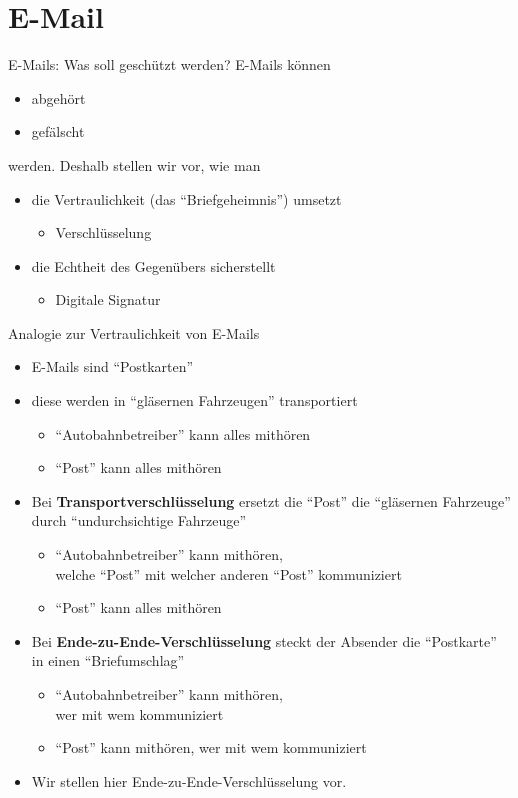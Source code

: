 \section{E-Mail}
  \begin{frame}{E-Mails: Was soll geschützt werden?}
    E-Mails können
    \begin{itemize}
      \item abgehört
      \item gefälscht
    \end{itemize}
    werden. Deshalb stellen wir vor, wie man
    \begin{itemize}
      \item die Vertraulichkeit (das ``Briefgeheimnis'') umsetzt
      \begin{itemize}
        \item Verschlüsselung
      \end{itemize}
      \item die Echtheit des Gegenübers sicherstellt
      \begin{itemize}
        \item Digitale Signatur
      \end{itemize}
    \end{itemize}
  \end{frame}

  \begin{frame}{Analogie zur Vertraulichkeit von E-Mails}
    \begin{itemize}
      \item E-Mails sind ``Postkarten''
      \item diese werden in ``gläsernen Fahrzeugen'' transportiert
      \begin{itemize}
        \item ``Autobahnbetreiber'' kann alles mithören
        \item ``Post'' kann alles mithören
      \end{itemize}
      \item Bei \textbf{Transportverschlüsselung} ersetzt die ``Post'' die ``gläsernen Fahrzeuge'' durch ``undurchsichtige Fahrzeuge''
      \begin{itemize}
        \item ``Autobahnbetreiber'' kann mithören,\\welche ``Post'' mit welcher anderen ``Post'' kommuniziert
        \item ``Post'' kann alles mithören
      \end{itemize}
      \item Bei \textbf{Ende-zu-Ende-Verschlüsselung} steckt der Absender die ``Postkarte'' in einen ``Briefumschlag''
      \begin{itemize}
        \item ``Autobahnbetreiber'' kann mithören,\\wer mit wem kommuniziert
        \item ``Post'' kann mithören, wer mit wem kommuniziert
      \end{itemize}
      \item Wir stellen hier Ende-zu-Ende-Verschlüsselung vor.
    \end{itemize}
  \end{frame}

